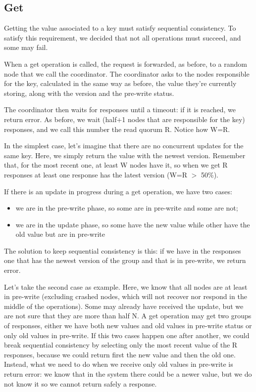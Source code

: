 \documentclass[12pt, a4paper]{article}
\begin{document}
    \subsection{Get}
    Getting the value associated to a key must satisfy sequential consistency. To satisfy this requirement, we decided that not all operations must succeed, and some may fail.

    When a get operation is called, the request is forwarded, as before, to a random node that we call the coordinator. The coordinator asks to the nodes responsible for the key, calculated in the same way as before, the value they're currently storing, along with the version and the pre-write status.

    The coordinator then waits for responses until a timeout: if it is reached, we return error. As before, we wait (half+1 nodes that are responsible for the key) responses, and we call this number the read quorum R. Notice how W=R. 

    In the simplest case, let's imagine that there are no concurrent updates for the same key. Here, we simply return the value with the newest version. Remember that, for the most recent one, at least W nodes have it, so when we get R responses at least one response has the latest version (W=R $>$ 50\%).

    If there is an update in progress during a get operation, we have two cases: 
    \begin{itemize}
        \item we are in the pre-write phase, so some are in pre-write and some are not;
        \item we are in the update phase, so some have the new value while other have the old value but are in pre-write
    \end{itemize}
    The solution to keep sequential consistency is this: if we have in the responses one that has the newest version of the group and that is in pre-write, we return error. 
    
    Let's take the second case as example. Here, we know that all nodes are at least in pre-write (excluding crashed nodes, which will not recover nor respond in the middle of the operations). Some may already have received the update, but we are not sure that they are more than half N. A get operation may get two groups of responses, either we have both new values and old values in pre-write status or only old values in pre-write. If this two cases happen one after another, we could break sequential consistency by selecting only the most recent value of the R responses, because we could return first the new value and then the old one. Instead, what we need to do when we receive only old values in pre-write is return error: we know that in the system there could be a newer value, but we do not know it so we cannot return safely a response. 
    
\end{document}
